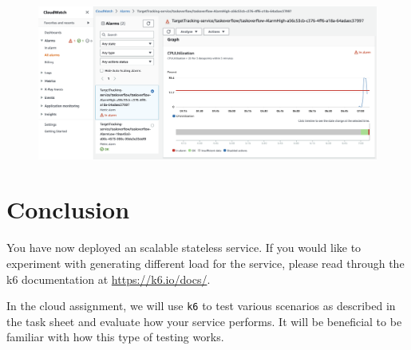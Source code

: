 \documentclass{csse4400}
\begin{document}
\begin{figure}[H]
  \begin{center}
    \includegraphics[width=\textwidth]{images/ecs3}
  \end{center}
\end{figure}


\section{Conclusion}
You have now deployed an scalable stateless service.
If you would like to experiment with generating different load for the service,
please read through the k6 documentation at \url{https://k6.io/docs/}.

In the cloud assignment,
we will use \texttt{k6} to test various scenarios as described in the task sheet and evaluate how your service performs.
It will be beneficial to be familiar with how this type of testing works.



\end{document}
